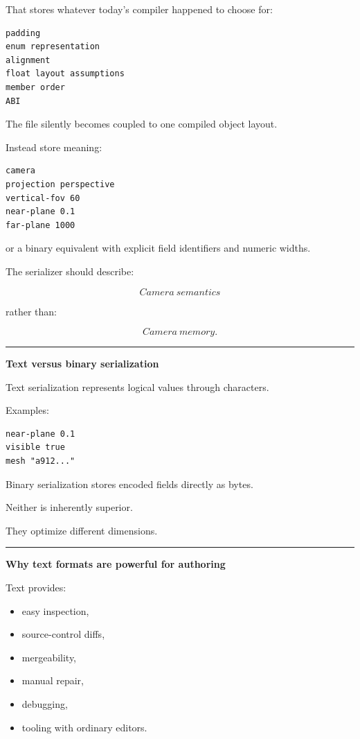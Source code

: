 That stores whatever today's compiler happened to choose for:

\begin{verbatim}
padding
enum representation
alignment
float layout assumptions
member order
ABI
\end{verbatim}

The file silently becomes coupled to one compiled object layout.

Instead store meaning:

\begin{verbatim}
camera
projection perspective
vertical-fov 60
near-plane 0.1
far-plane 1000
\end{verbatim}

or a binary equivalent with explicit field identifiers and numeric widths.

The serializer should describe:

\[
\boxed{
Camera\ semantics
}
\]

rather than:

\[
\boxed{
Camera\ memory.
}
\]

\begin{center}\rule{0.5\linewidth}{0.5pt}\end{center}

\textbf{Text versus binary serialization}

Text serialization represents logical values through characters.

Examples:

\begin{verbatim}
near-plane 0.1
visible true
mesh "a912..."
\end{verbatim}

Binary serialization stores encoded fields directly as bytes.

Neither is inherently superior.

They optimize different dimensions.

\begin{center}\rule{0.5\linewidth}{0.5pt}\end{center}

\textbf{Why text formats are powerful for authoring}

Text provides:

\begin{itemize}
\tightlist
\item
  easy inspection,
\item
  source-control diffs,
\item
  mergeability,
\item
  manual repair,
\item
  debugging,
\item
  tooling with ordinary editors.
\end{itemize}

